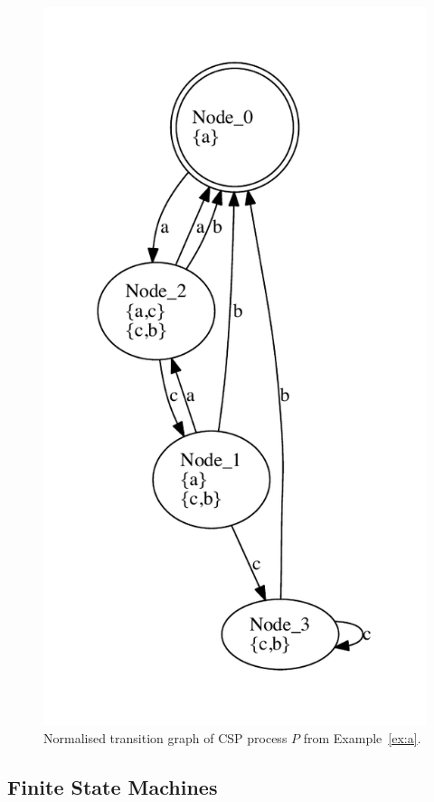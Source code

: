  \begin{figure}
 \begin{center}
\includegraphics[width=.5\textwidth]{q0.pdf}
\end{center}
\caption{Normalised transition graph of CSP process $P$ from Example~\ref{ex:a}.}
 \label{fig:tga}
 \end{figure}



\subsection{Finite State Machines}